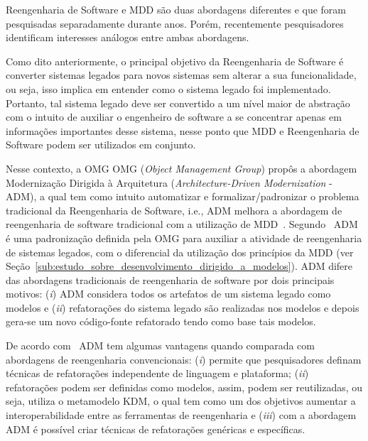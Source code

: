 

Reengenharia de Software e MDD são duas abordagens diferentes e que foram pesquisadas separadamente durante anos. Porém, recentemente pesquisadores identificam interesses análogos entre ambas abordagens. 

Como dito anteriormente, o principal objetivo da Reengenharia de Software é converter sistemas legados para novos sistemas sem alterar a sua funcionalidade, ou seja, isso implica em entender como o sistema legado foi implementado. Portanto, tal sistema legado deve ser convertido a um nível maior de abstração com o intuito de auxiliar o engenheiro de software a se concentrar apenas em informações importantes desse sistema, nesse ponto que MDD e Reengenharia de Software podem ser utilizados em conjunto.

Nesse contexto, a OMG OMG (\textit{Object Management Group}) propôs a abordagem Modernização Dirigida à Arquitetura (\textit{Architecture-Driven Modernization} - ADM), a qual tem como intuito automatizar e formalizar/padronizar o problema tradicional da Reengenharia de Software, i.e., ADM melhora a abordagem  de reengenharia de software tradicional com a utilização de MDD~\cite{PerezCastillo:2011jo}. Segundo~\citet{rezCastillo:2011gm} ADM é uma padronização definida pela OMG para auxiliar a atividade de reengenharia de sistemas legados, com o diferencial da utilização dos princípios da MDD (ver Seção~\ref{sub:estudo_sobre_desenvolvimento_dirigido_a_modelos}). ADM difere das abordagens tradicionais de reengenharia de software por dois principais motivos: (\textit{i}) ADM considera todos os artefatos de um sistema legado como modelos e (\textit{ii}) refatorações do sistema legado são realizadas nos modelos e depois gera-se um novo código-fonte refatorado tendo como base tais modelos. 

De acordo com~\citet{PerezCastillo:2011jo} ADM tem algumas vantagens quando comparada com abordagens de reengenharia convencionais: (\textit{i}) permite que pesquisadores definam técnicas de refatorações independente de linguagem e plataforma; (\textit{ii}) refatorações podem ser definidas como modelos, assim, podem ser reutilizadas, ou seja, utiliza o metamodelo KDM, o qual tem como um dos objetivos aumentar a interoperabilidade entre as ferramentas de reengenharia e (\textit{iii}) com a abordagem ADM é possível criar técnicas de refatorações genéricas e específicas. 


